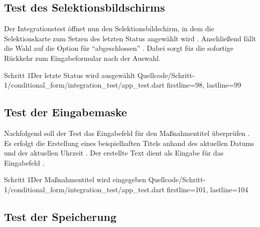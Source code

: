 \clearpage

\subsection{Test des Selektionsbildschirms}
\label{sec:TestDesSelektionsbildschirms}

Der Integrationstest öffnet nun den Selektionsbildschirm, in dem die Selektionskarte zum Setzen des letzten Status angewählt wird .
Anschließend fällt die Wahl auf die Option für \enquote{abgeschlossen} .
Dabei sorgt  für die sofortige Rückkehr zum Eingabeformular nach der Auswahl.
 
\begin{alexlisting}{Schritt 1}{Der letzte Status wird ausgewählt}
  {Quellcode/Schritt-1/conditional_form/integration_test/app_test.dart}
  {firstline=98, lastline=99}
  \label{lst:Schritt1LetzterStatusWirdAusgewählt}
\end{alexlisting}



\subsection{Test der Eingabemaske}
\label{sec:TestDerEingabemaske}

Nachfolgend soll der Test das Eingabefeld für den Maßnahmentitel überprüfen \Lst{\ref{lst:Schritt1MassnahmentitelWirdEingegeben}}.
Es erfolgt die Erstellung eines beispielhaften Titels anhand des aktuellen Datums und der aktuellen Uhrzeit .
Der erstellte Text dient als Eingabe für das Eingabefeld . 

\begin{alexlisting}{Schritt 1}{Der Maßnahmentitel wird eingegeben}
  {Quellcode/Schritt-1/conditional_form/integration_test/app_test.dart}
  {firstline=101, lastline=104}
  \label{lst:Schritt1MassnahmentitelWirdEingegeben}
\end{alexlisting}

\subsection{Test der Speicherung}
\label{sec:TestDerSpeicherung}

